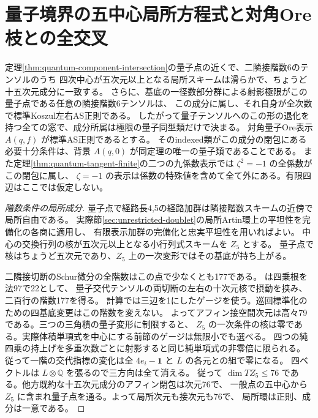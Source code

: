 \section{量子境界の五中心局所方程式と対角Ore枝との全交叉}
\label{sec:quantum-ore-incidence}
\begin{theorem}\label{thm:quantum-ore-incidence}
定理\ref{thm:quantum-component-intersection}の量子点の近くで、二隣接階数6のテンソルのうち
四次中心が五次元以上となる局所スキームは滑らかで、ちょうど十五次元成分に一致する。
さらに、基底の一径数部分群による射影極限がこの量子点である任意の隣接階数6テンソルは、
この成分に属し、それ自身が全次数で標準Koszul左右AS正則である。
したがって量子テンソルへのこの形の退化を持つ全ての窓で、成分所属は極限の量子同型類だけで決まる。
対角量子Ore表示 $A(q,f)$ が標準AS正則であるとする。
そのindexed類がこの成分の閉包にある必要十分条件は、背景 $A(q,0)$ が同定理の唯一の量子類であることである。
また定理\ref{thm:quantum-tangent-finite}の二つの九係数表示では $\zeta^2=-1$ の全係数がこの閉包に属し、
$\zeta=-1$ の表示は係数の特殊値を含めて全て外にある。有限四辺はここでは仮定しない。
\end{theorem}
\begin{proof}[階数条件の局所成分]
量子点で経路長4,5の経路加群は隣接階数スキームの近傍で局所自由である。
実際節\ref{sec:unrestricted-doublet}の局所Artin環上の平坦性を完備化の各商に適用し、
有限表示加群の完備化と忠実平坦性を用いればよい。
中心の交換行列の核が五次元以上となる小行列式スキームを $Z_5$ とする。
量子点で核はちょうど五次元であり、$Z_5$ 上の一次変形ではその基底が持ち上がる。

二隣接切断のSchur微分の全階数はこの点で少なくとも177である。
 は四乗根を法97で22として、
量子交代テンソルの両切断の左右の十次元核で摂動を挟み、二百行の階数177を得る。
計算では三辺を1にしたゲージを使う。巡回標準化のための四基底変更はこの階数を変えない。
よってアフィン接空間次元は高々79である。三つの三角積の量子変形に制限すると、
$Z_5$ の一次条件の核は零である。実際体積単項式を中心にする前節のゲージは無限小でも選べる。
四つの純四乗の持上げを多重次数ごとに射影すると同じ純単項式の非零倍に限られる。
従って一階の交代指標の変化は全 $4e_i-\mathbf1$ と $L$ の各元との組で零になる。
四ベクトルは $L\otimes\mathbb Q$ を張るので三方向は全て消える。
従って $\dim T Z_5\le76$ である。他方既約な十五次元成分のアフィン閉包は次元76で、
一般点の五中心から $Z_5$ に含まれ量子点を通る。よって局所次元も接次元も76で、
局所環は正則、成分は一意である。
\end{proof}

